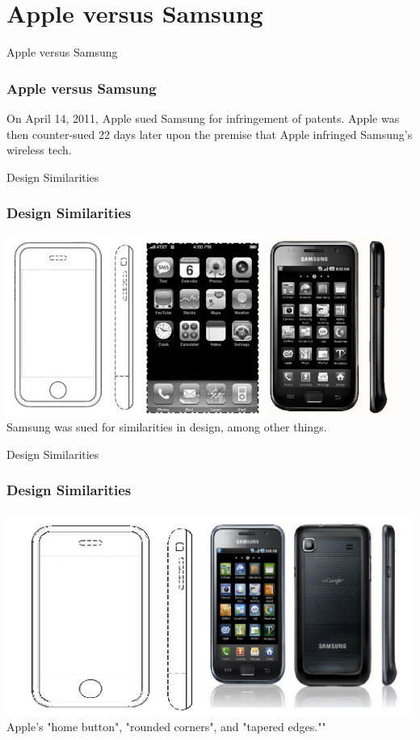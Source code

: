 \documentclass{beamer}
\begin{document}
\section{Apple versus Samsung}
\begin{frame}{Apple versus Samsung}
\frametitle{Apple versus Samsung}
	On April 14, 2011, Apple sued Samsung for infringement of patents. \pause
	Apple was then counter-sued 22 days later upon the premise that Apple infringed Samsung's wireless tech. \pause
\end{frame}
\begin{frame}{Design Similarities}
\frametitle{Design Similarities}
	\centering
	\includegraphics[scale=0.33]{applesamsung} \\
	Samsung was sued for similarities in design, among other things.
\end{frame}
\begin{frame}{Design Similarities}
\frametitle{Design Similarities}
	\centering
	\includegraphics[scale=0.33]{as2}\\
	Apple's "home button", "rounded corners", and "tapered edges.""
\end{frame}
\end{document}
